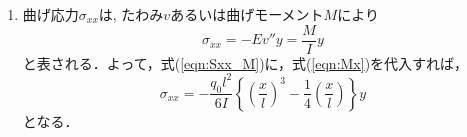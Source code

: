 \documentclass[10pt,a4j]{jarticle}
\begin{document}
\begin{enumerate}
\begin{equation}
			-
			\frac{5}{2}
			\left(\frac{x}{l}\right)^2
			+
			\frac{7}{48}
		\right\}
	\end{equation}
\item
曲げ応力$\sigma_{xx}$は, たわみ$v$あるいは曲げモーメント$M$により
\begin{equation}
	\sigma_{xx}=-Ev''y= \frac{M}{I}y 
	\label{eqn:Sxx_M}
\end{equation}
と表される．よって，式(\ref{eqn:Sxx_M})に，式(\ref{eqn:Mx})を代入すれば，
\begin{equation}
	\sigma_{xx}=
	-\frac{q_0l^2}{6I}
	\left\{	
	\left(\frac{x}{l}\right)^3
	-
	\frac{1}{4}	
	\left(\frac{x}{l}\right)
	\right\}y
\end{equation}
	となる．
\end{enumerate}
\end{document}
